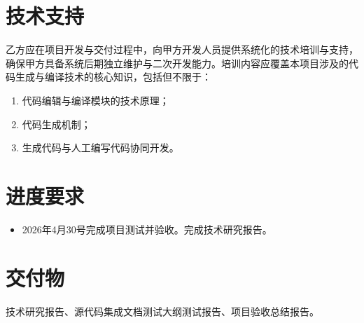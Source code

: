 \documentclass[hyperref,a4paper,UTF8, 12pt]{ctexart}
\begin{document}
\section{技术支持}

乙方应在项目开发与交付过程中，向甲方开发人员提供系统化的技术培训与支持，确保甲方具备系统后期独立维护与二次开发能力。培训内容应覆盖本项目涉及的代码生成与编译技术的核心知识，包括但不限于：
\begin{enumerate}
  \item 代码编辑与编译模块的技术原理；
  \item 代码生成机制；
  \item 生成代码与人工编写代码协同开发。
\end{enumerate}

% 

\section{进度要求}
\begin{itemize}
  \item 2026年4月30号完成项目测试并验收。完成技术研究报告。
\end{itemize}

\section{交付物}

技术研究报告、源代码集成文档测试大纲测试报告、项目验收总结报告。
\end{document}
